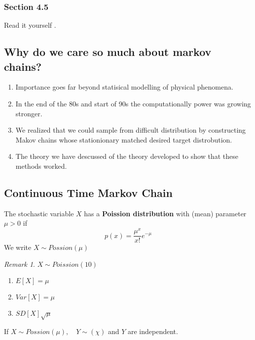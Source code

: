 \documentclass{article}
\theoremstyle{remark}
\newtheorem*{remark}{Remark}
\begin{document}
\subsubsection{Section 4.5}%
\label{ssub:section_4_5}
Read it yourself .


\subsection{Why do we care so much about markov chains?}%
\label{sub:why_do_we_care_so_much_about_markov_chains_}

\begin{enumerate}[label=(\roman*)]
  \item Importance goes far beyond statisical modelling of physical phenomena.
  \item In the end of the 80s and start of 90s the computationally power was growing stronger.
  \item We realized that we could sample from difficult distribution  by constructing Makov chains whose stationionary matched desired target distrobution.
  \item The theory we have descussed of the theory developed to show that these methods worked.
\end{enumerate}

\subsection{Continuous Time Markov Chain}%
\label{sub:continuous_time_markov_chain}


\begin{definition}
  The stochastic variable $X$  has a \textbf{Poission distribution}  with (mean) parameter $\mu > 0$ if \[
  p\left( x \right) = \frac{\mu ^{x}}{x!}  e^{- \mu }
  \] 
  We write $X \sim Possion (\mu )$
\end{definition}

\begin{remark}
  $X \sim Poission (10)$
   \begin{enumerate}[label=(\roman*)]
    \item $E\left[ X \right] = \mu $
    \item $Var\left[ X \right] = \mu $
    \item $SD\left[ X \right] \sqrt{\mu } $
  \end{enumerate}
\end{remark}

\begin{theorem}
  If $X \sim Possion (\mu ), \quad  Y \sim \left( \chi  \right) $ and $Y $ are independent. 
\end{theorem}
\end{document}
